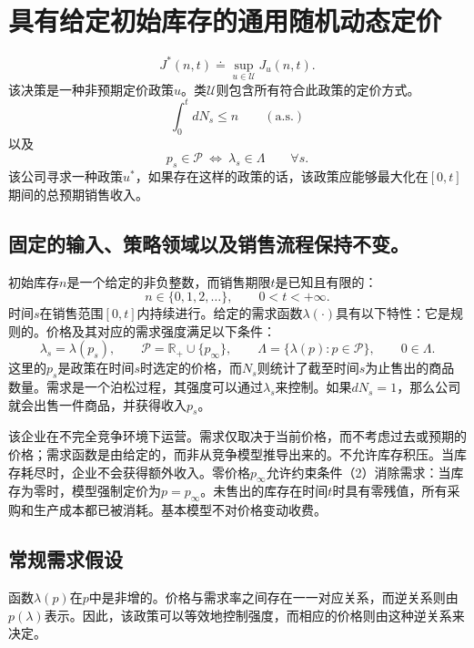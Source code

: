 \documentclass{article}
\begin{document}
\section*{具有给定初始库存的通用随机动态定价}

\begin{equation}
J^*(n,t)\doteq\sup_{u\in\mathcal U}J_u(n,t).
\tag{7}
\end{equation}
该决策是一种非预期定价政策$u$。类$\mathcal U$则包含所有符合此政策的定价方式。
\begin{equation}
\int_0^t dN_s\leq n\qquad(\mathrm{a.s.})
\tag{2}
\end{equation}
以及
\begin{equation}
p_s\in\mathcal P\ \Longleftrightarrow\ \lambda_s\in\Lambda
\qquad\forall s.
\tag{3}
\end{equation}
该公司寻求一种政策$u^*$，如果存在这样的政策的话，该政策应能够最大化在$[0,t]$期间的总预期销售收入。

\subsection*{固定的输入、策略领域以及销售流程保持不变。}
初始库存$n$是一个给定的非负整数，而销售期限$t$是已知且有限的：
\[
n\in\{0,1,2,\ldots\},\qquad 0<t<+\infty.
\]
时间$s$在销售范围$[0,t]$内持续进行。给定的需求函数$\lambda(\cdot)$具有以下特性：它是规则的。价格及其对应的需求强度满足以下条件：
\[
\lambda_s=\lambda(p_s),\qquad
\mathcal P=\mathbb R_+\cup\{p_\infty\},\qquad
\Lambda=\{\lambda(p):p\in\mathcal P\},\qquad
0\in\Lambda.
\]
这里的$p_s$是政策在时间$s$时选定的价格，而$N_s$则统计了截至时间$s$为止售出的商品数量。需求是一个泊松过程，其强度可以通过$\lambda_s$来控制。如果$dN_s=1$，那么公司就会出售一件商品，并获得收入$p_s$。

该企业在不完全竞争环境下运营。需求仅取决于当前价格，而不考虑过去或预期的价格；需求函数是由给定的，而非从竞争模型推导出来的。不允许库存积压。当库存耗尽时，企业不会获得额外收入。零价格$p_\infty$允许约束条件（2）消除需求：当库存为零时，模型强制定价为$p=p_\infty$。未售出的库存在时间$t$时具有零残值，所有采购和生产成本都已被消耗。基本模型不对价格变动收费。

\subsection*{常规需求假设}
函数$\lambda(p)$在$p$中是非增的。价格与需求率之间存在一一对应关系，而逆关系则由$p(\lambda)$表示。因此，该政策可以等效地控制强度，而相应的价格则由这种逆关系来决定。
\end{document}
